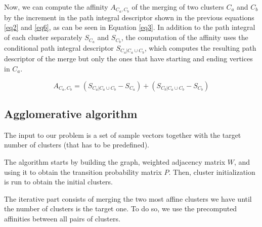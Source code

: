 \documentclass[
	10pt,
	parskip=half-,	
	paper=a4,
	english
	]{scrartcl}
\begin{document}
Now, we can compute the affinity \(A_{C_a,C_b}\) of the merging of two clusters \(C_a\) and \(C_b\) by the increment in the path integral descriptor shown in the previous equations \ref{eq2} and \ref{eq6}, as can be seen in Equation \ref{eq3}. In addition to the path integral of each cluster separately \(S_{C_a}\) and \(S_{C_b}\), the computation of the affinity uses the conditional path integral descriptor \(S_{C_a|C_a\cup C_b}\), which computes the resulting path descriptor of the merge but only the ones that have starting and ending vertices in \(C_a\).

\begin{equation}
    A_{C_a,C_b} = (S_{C_a|C_a\cup C_b}-S_{C_a}) + (S_{C_b|C_a\cup C_b}-S_{C_b})
    \label{eq3}
\end{equation}

\subsection{Agglomerative algorithm}

The input to our problem is a set of sample vectors together with the target number of clusters (that has to be predefined).

The algorithm starts by building the graph, weighted adjacency matrix \(W\), and using it to obtain the transition probability matrix \(P\). Then, cluster initialization is run to obtain the initial clusters.

The iterative part consists of merging the two most affine clusters we have until the number of clusters is the target one. To do so, we use the precomputed affinities between all pairs of clusters. %

\end{document}
